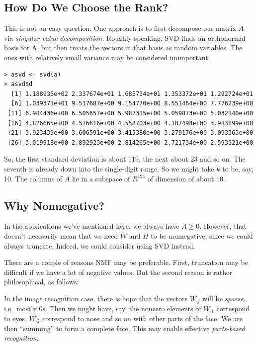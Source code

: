 \subsection{How Do We Choose the Rank?}

This is not an easy question.  One approach is to first decompose our
matrix $A$ via {\it singular value decomposition}.  Roughly speaking,
SVD finds an orthonormal basis for A, but then treats the vectors in
that basis as random variables.  The ones with relatively small variance
may be considered unimportant.

\begin{lstlisting}
> asvd <- svd(a)
> asvd$d
  [1] 1.188935e+02 2.337674e+01 1.685734e+01 1.353372e+01 1.292724e+01
  [6] 1.039371e+01 9.517687e+00 9.154770e+00 8.551464e+00 7.776239e+00
 [11] 6.984436e+00 6.505657e+00 5.987315e+00 5.059873e+00 5.032140e+00
 [16] 4.826665e+00 4.576616e+00 4.558703e+00 4.107498e+00 3.983899e+00
 [21] 3.923439e+00 3.606591e+00 3.415380e+00 3.279176e+00 3.093363e+00
 [26] 3.019918e+00 2.892923e+00 2.814265e+00 2.721734e+00 2.593321e+00
\end{lstlisting}

So, the first standard deviation is about 119, the next about 23 and so
on.  The seventh is already down into the single-digit range.  So we
might take $k$ to be, say, 10.  The columns of $A$ lie in a subspace of
$R^{194}$ of dimension of about 10.

\subsection{Why Nonnegative?}

In the applications we've mentioned here, we always have $A \geq 0$.
However, that doesn't necesarily mean that we need $W$ and $H$ to be
nonnegative, since we could always truncate.  Indeed, we could consider
using SVD instead.

There are a couple of reasons NMF may be preferable.  First, truncation
may be difficult if we have a lot of negative values.  But the second
reason is rather philosophical, as follows:

In the image recognition case, there is hope that the vectors $W_{\cdot
j}$ will be {\it sparse}, i.e.\ mostly 0s. Then we might have, say, the
nonzero elements of $W_{\cdot 1}$ correspond to eyes, $W_{\cdot 2}$
correspond to nose and so on with other parts of the face.  We are then
``summing'' to form a complete face.  This may enable effective {\it
parts-based recognition}.

